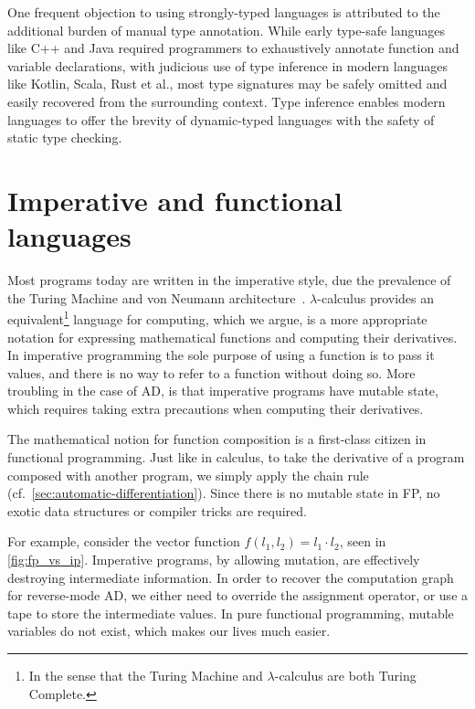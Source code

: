 \documentclass[12pt,initial,twoside,maitrise]{dms}
\numberwithin{equation}{section}
\numberwithin{table}{chapter}
\numberwithin{figure}{chapter}
\begin{document}
One frequent objection to using strongly-typed languages is attributed to the additional burden of manual type annotation. While early type-safe languages like C++ and Java required programmers to exhaustively annotate function and variable declarations, with judicious use of type inference in modern languages like Kotlin, Scala, Rust et al., most type signatures may be safely omitted and easily recovered from the surrounding context. Type inference enables modern languages to offer the brevity of dynamic-typed languages with the safety of static type checking.

\section{Imperative and functional languages}

Most programs today are written in the imperative style, due the prevalence of the Turing Machine and von Neumann architecture~\citep{backus2007can}. $\lambda$-calculus provides an equivalent\footnote{In the sense that the Turing Machine and $\lambda$-calculus are both Turing Complete.} language for computing, which we argue, is a more appropriate notation for expressing mathematical functions and computing their derivatives. In imperative programming the sole purpose of using a function is to pass it values, and there is no way to refer to a function without doing so. More troubling in the case of AD, is that imperative programs have mutable state, which requires taking extra precautions when computing their derivatives.

The mathematical notion for function composition is a first-class citizen in functional programming. Just like in calculus, to take the derivative of a program composed with another program, we simply apply the chain rule (cf.~\autoref{sec:automatic-differentiation}). Since there is no mutable state in FP, no exotic data structures or compiler tricks are required.

For example, consider the vector function $f(l_1, l_2) = l_1 \cdot l_2$, seen in \autoref{fig:fp_vs_ip}. Imperative programs, by allowing mutation, are effectively destroying intermediate information. In order to recover the computation graph for reverse-mode AD, we either need to override the assignment operator, or use a tape to store the intermediate values. In pure functional programming, mutable variables do not exist, which makes our lives much easier.
\end{document}
